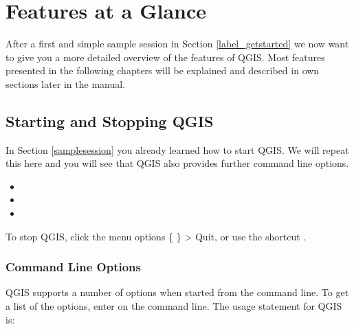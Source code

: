 
\section{Features at a Glance}\label{feature_glance}


After a first and simple sample session in Section \ref{label_getstarted} we now 
want to give you a more detailed overview of the features of QGIS. 
Most features presented in the following chapters will be explained and described in 
own sections later in the manual.

\subsection{Starting and Stopping QGIS}\label{label_startinqgis}

In Section \ref{samplesession} you already learned how to start QGIS. We will 
repeat this here and you will see that QGIS also provides further command line options. 

\begin{itemize}
\item {} 
\item {}
\item {}
\end{itemize} 

To stop QGIS, click the menu options \{\nix{} \} > Quit,
or use the shortcut .

\subsubsection{Command Line Options}
\label{label_commandline}

\nix QGIS supports a number of options when started from the command line. To
get a list of the options, enter  on the command line.
The usage statement for QGIS is:

